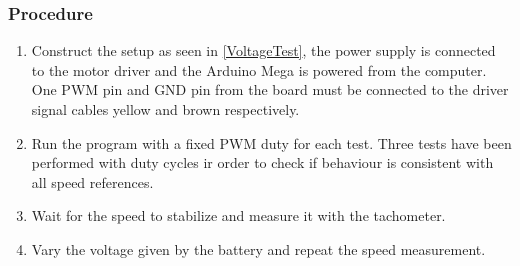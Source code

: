 \subsubsection{Procedure}
\begin{enumerate}
	\item Construct the setup as seen in \autoref{VoltageTest}, the power supply is connected to the motor driver and the Arduino Mega is powered from the computer. One PWM pin and GND pin from the board must be connected to the driver signal cables yellow and brown respectively. 
	\item Run the program with a fixed PWM duty for each test. Three tests have been performed with duty cycles ir order to check if behaviour is consistent with all speed references.
	\item Wait for the speed to stabilize and measure it with the tachometer. 
	\item Vary the voltage given by the battery and repeat the speed measurement.
\end{enumerate}


